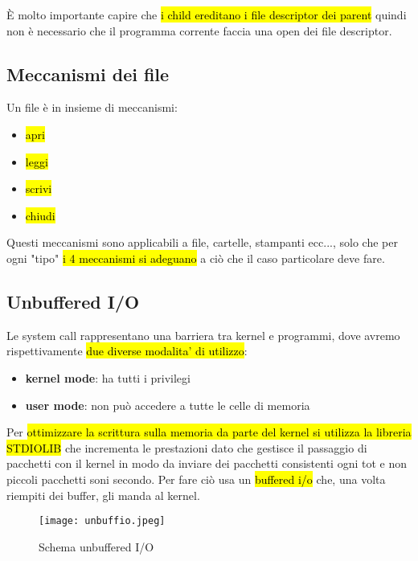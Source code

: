 È molto importante capire che \hl{ i child ereditano i file descriptor dei parent} quindi non è necessario che il programma corrente faccia una open dei file descriptor.


\subsection{Meccanismi dei file}

Un file è in insieme di meccanismi: 

\begin{itemize}
	\item \hl{apri}
	\item \hl{leggi}
	\item \hl{scrivi}
	\item \hl{chiudi}
\end{itemize}


Questi meccanismi sono applicabili a file, cartelle, stampanti ecc..., solo che per ogni "tipo" \hl{i 4 meccanismi si adeguano} a ciò che il caso particolare deve fare.


\subsection{Unbuffered I/O}

Le system call rappresentano una barriera tra kernel e programmi, dove avremo rispettivamente \hl{due diverse modalita' di utilizzo}:

\begin{itemize}
	\item \textbf{kernel mode}: ha tutti i privilegi
	\item \textbf{user mode}: non può accedere a tutte le celle di memoria
\end{itemize}


Per \hl{ottimizzare la scrittura sulla memoria da parte del kernel si utilizza la libreria STDIOLIB} che incrementa le prestazioni dato che gestisce il passaggio di pacchetti con il kernel in modo da inviare dei pacchetti consistenti ogni tot e non piccoli pacchetti soni secondo. Per fare ciò usa un \hl{buffered i/o} che, una volta riempiti dei buffer, gli manda al kernel.


\begin{figure}[H]
\centering
\texttt{[image: unbuffio.jpeg]}
\caption{Schema unbuffered I/O} 
\label{unbuffio}
\end{figure}


